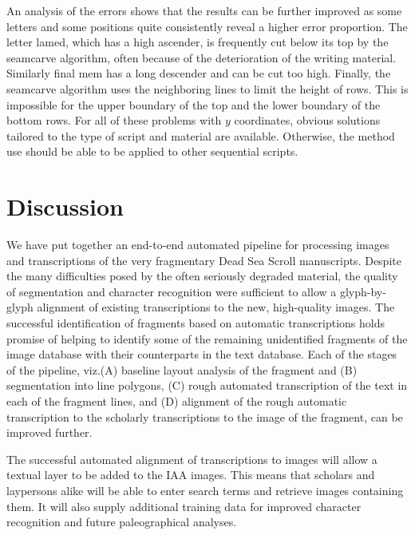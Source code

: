An analysis of the errors shows that the results can be further improved as
some letters and some positions quite consistently reveal a higher error
proportion.  The letter lamed, which has a high ascender, is frequently cut
below its top by the seamcarve algorithm, often because of the deterioration of
the writing material.  Similarly final mem has a long descender and can be cut
too high.  Finally, the seamcarve algorithm uses the neighboring lines to limit
the height of rows.  This is impossible for the upper boundary of the top and
the lower boundary of the bottom rows.  For all of these problems with $y$
coordinates, obvious solutions tailored to the type of script and material are
available.  Otherwise, the method use should be able to be applied to other
sequential scripts.


\section{Discussion}

We have put together an end-to-end automated pipeline for processing images and
transcriptions of the very fragmentary Dead Sea Scroll manuscripts.  Despite
the many difficulties posed by the often seriously degraded material, the
quality of segmentation and character recognition were sufficient to allow a
glyph-by-glyph alignment of existing transcriptions to the new, high-quality
images.  The successful identification of fragments based on automatic
transcriptions holds promise of helping to identify some of the remaining
unidentified fragments of the image database with their counterparts in the
text database.  Each of the stages of the pipeline, viz.\@ (A) baseline layout
analysis of the fragment and (B) segmentation into line polygons, (C) rough
automated transcription of the text in each of the fragment lines, and (D)
alignment of the rough automatic transcription to the scholarly transcriptions
to the image of the fragment, can be improved further.

The successful automated alignment of transcriptions to images will allow a
textual layer to be added to the IAA images.  This means that scholars and
laypersons alike will be able to enter search terms and retrieve images
containing them.  It will also supply additional training data for improved
character recognition and future paleographical analyses.

